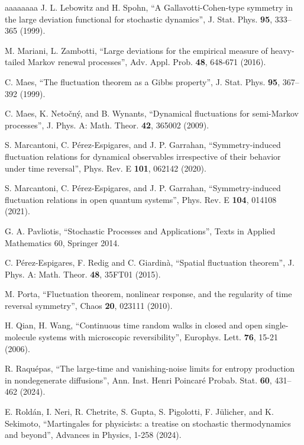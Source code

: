 \documentclass[a4paper,11pt]{article}
\numberwithin{equation}{section}
\begin{document}
\begin{thebibliography}{aaaaaaaa}
 J. L. Lebowitz and H. Spohn, ``A Gallavotti-Cohen-type symmetry in the large deviation functional for stochastic dynamics'',
J. Stat. Phys. {\bf 95}, 333–365 (1999).

 M. Mariani, L. Zambotti, ``Large deviations for the empirical measure of heavy-tailed Markov renewal processes'', Adv. Appl. Prob. {\bf 48}, 648-671 (2016).

 C. Maes, ``The fluctuation theorem as a Gibbs property'', J. Stat. Phys. {\bf 95}, 367–392 (1999).

 C. Maes, K. Neto\v cn\'y, and B. Wynants, ``Dynamical fluctuations for semi-Markov processes'', J. Phys. A: Math. Theor. {\bf 42}, 365002 (2009).

 S. Marcantoni, C. P\'erez-Espigares, and J. P. Garrahan,  ``Symmetry-induced fluctuation relations for dynamical observables irrespective of their behavior under time reversal'', Phys. Rev. E {\bf 101}, 062142 (2020).

 S. Marcantoni, C. P\'erez-Espigares, and J. P. Garrahan, ``Symmetry-induced fluctuation relations in open quantum systems'', Phys. Rev. E {\bf 104}, 014108 (2021).

 G. A. Pavliotis, ``Stochastic Processes and Applications'', Texts in Applied Mathematics 60, Springer 2014.

 C. P\'erez-Espigares, F.  Redig and C.  Giardin\`a,  ``Spatial fluctuation theorem'', J. Phys. A: Math. Theor.  {\bf 48},  35FT01 (2015).

 M. Porta, ``Fluctuation theorem, nonlinear response, and the regularity of time reversal symmetry'', Chaos {\bf 20}, 023111 (2010).

 H. Qian, H. Wang, ``Continuous time random walks in closed and open single-molecule systems with microscopic reversibility'', Europhys. Lett. {\bf 76}, 15-21 (2006).

 R. Raqu\'epas, ``The large-time and vanishing-noise limits for entropy production in nondegenerate diffusions'', Ann. Inst. Henri Poincar\'e Probab. Stat. {\bf 60}, 431–462 (2024).

 E. Rold\'an, I. Neri, R. Chetrite, S. Gupta, S. Pigolotti, F. J\"ulicher, and K. Sekimoto, ``Martingales for physicists: a treatise on stochastic thermodynamics and beyond'', Advances in Physics, 1-258 (2024).


\end{thebibliography}
\end{document}
